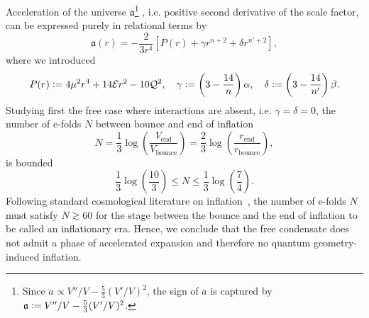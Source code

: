 \documentclass[11pt,a4paper]{article}
\newcommand{\defeq}{\vcentcolon=}
\begin{document}
Acceleration of the universe $\mathfrak{a}$\footnote{Since $\ddot{a}\propto V''/V-\frac{5}{3}(V'/V)^2$, the sign of $\ddot{a}$ is captured by $\mathfrak{a}\defeq V''/V-\frac{5}{3}(V'/V)^2 $.} , i.e. positive second derivative of the scale factor, can be expressed purely in relational terms by
%
\begin{equation}\label{eq:phenomenological acceleration}
\mathfrak{a}(r)
=
-\frac{2}{3r^4}\left[P(r)+\gamma r^{n+2}+\delta r^{n'+2}\right],
\end{equation}
%
where we introduced
%
\begin{equation}
P(r) \defeq 4\mu^2r^4+14\mathcal{E}r^2-10\mathcal{Q}^2, \quad \gamma \defeq \left(3-\frac{14}{n}\right)\alpha,\quad\delta \defeq \left(3-\frac{14}{n'}\right)\beta.
\end{equation}
%
Studying first the free case where interactions are absent, i.e. $\gamma = \delta = 0$, the number of e-folds $N$ between bounce and end of inflation
%
\begin{equation}\label{eq:number of efolds}
N
=
\frac{1}{3}\log(\frac{V_{\text{end}}}{V_{\text{bounce}}})
=
\frac{2}{3}\log(\frac{r_{\text{end}}}{r_{\text{bounce}}}),
\end{equation}
%
is bounded
%
\begin{equation}
\frac{1}{3}\log(\frac{10}{3})\leq N \leq 
\frac{1}{3}\log(\frac{7}{4}).
\end{equation}
%
Following standard cosmological literature on inflation~\cite{Mukhanov2005}, the number of e-folds $N$ must satisfy $N\gtrsim 60$ for the stage between the bounce and the end of inflation to be called an inflationary era. Hence, we conclude that the free condensate does not admit a phase of accelerated expansion and therefore no quantum geometry-induced inflation. 
\end{document}
